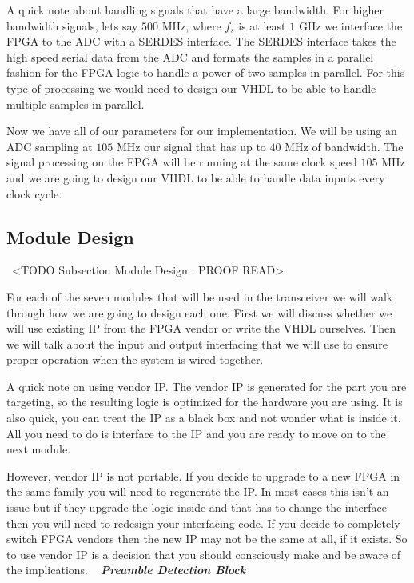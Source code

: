 A quick note about handling signals that have a large bandwidth. For higher bandwidth signals, lets say $500$ \ac{MHz}, where $f_s$ is at least $1$ \ac{GHz} we interface the \ac{FPGA} to the \ac{ADC} with a \ac{SERDES} interface. The \ac{SERDES} interface takes the high speed serial data from the \ac{ADC} and formats the samples in a parallel fashion for the \ac{FPGA} logic to handle a power of two samples in parallel. For this type of processing we would need to design our \ac{VHDL} to be able to handle multiple samples in parallel.

Now we have all of our parameters for our implementation. We will be using an \ac{ADC} sampling at $105$ \ac{MHz} our signal that has up to $40$ \ac{MHz} of bandwidth. The signal processing on the \ac{FPGA} will be running at the same clock speed $105$ \ac{MHz} and we are going to design our \ac{VHDL} to be able to handle data inputs every clock cycle.

\subsection{Module Design}
 <TODO Subsection Module Design : PROOF READ>

For each of the seven modules that will be used in the transceiver we will walk through how we are going to design each one. First we will discuss whether we will use existing \ac{IP} from the \ac{FPGA} vendor or write the \ac{VHDL} ourselves. Then we will talk about the input and output interfacing that we will use to ensure proper operation when the system is wired together. 

A quick note on using vendor \ac{IP}. The vendor \ac{IP} is generated for the part you are targeting, so the resulting logic is optimized for the hardware you are using. It is also quick, you can treat the \ac{IP} as a black box and not wonder what is inside it. All you need to do is interface to the \ac{IP} and you are ready to move on to the next module.

However, vendor \ac{IP} is not portable. If you decide to upgrade to a new \ac{FPGA} in the same family you will need to regenerate the \ac{IP}. In most cases this isn't an issue but if they upgrade the logic inside and that has to change the interface then you will need to redesign your interfacing code. If you decide to completely switch \ac{FPGA} vendors then the new \ac{IP} may not be the same at all, if it exists. So to use vendor \ac{IP} is a decision that you should consciously make and be aware of the implications. 
 
{\bf \emph{Preamble Detection Block}}


